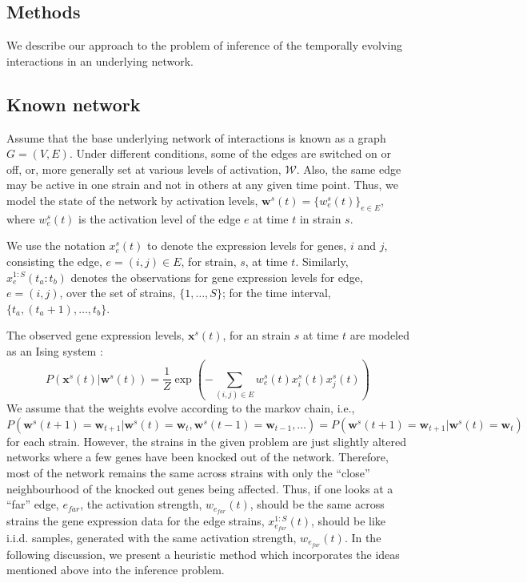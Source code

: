\documentclass{bioinfo}
\begin{document}
\begin{methods}
\section{Methods}
We describe our approach to the problem of inference of the temporally
evolving interactions in an underlying network. 
\subsection{Known network}
Assume that the base underlying network of interactions is known as a
graph $G=(V,E)$. Under different conditions, some of the edges are 
switched on or off, or, more generally set at various levels of
activation, $\mathcal W$. Also, the same edge may be active in one
strain and not in others at any given time point. Thus, we model the
state of the network by activation levels, $\mathbf{w}^{s}(t) = \{w^s_{e}(t)\}_{e
\in E}$, where $w^s_{e}(t)$ is the activation level of the edge $e$ at time $t$ in strain $s$. 

We use the notation $x^{s}_{e}(t)$ to denote the expression
levels for genes, $i$ and $j$, consisting the edge, $e=(i,j)\in E$,
for strain, $s$, at time $t$. Similarly,  $x_{e}^{1:S}(t_{a}:t_{b})$
denotes the observations for gene expression levels for edge,
$e=(i,j)$, over the set of strains, $\{1,\ldots, S\}$; for the time
interval, $\{t_{a}, (t_{a}+1), \ldots, t_{b}\}$. 

The observed gene expression levels, $\mathbf{x}^{s}(t)$, for an strain
$s$ at time $t$ are modeled as an Ising system \cite{Song09KELLER}:
\begin{equation}
\label{eq:ising}
 P\left(\mathbf{x}^{s}(t) | \mathbf{w}^{s}(t)\right) = 
      \frac{1}{Z} \exp \left( - \sum_{(i,j) \in E} w^s_{e}(t)
        x^{s}_i(t) x^{s}_j(t)\right)  
\end{equation}
We assume that the weights evolve according to the markov chain, i.e.,
$P(\mathbf{w}^{s}(t+1) = \mathbf{w}_{t+1} |  \mathbf{w}^{s}(t) =
  \mathbf{w}_{t}, \mathbf{w}^{s}(t-1) = \mathbf{w}_{t-1},
  \ldots) = P\left(\mathbf{w}^{s}(t+1) = \mathbf{w}_{t+1} |  \mathbf{w}^{s}(t) =
  \mathbf{w}_{t}\right)$ for each strain. 
However, the strains in the given problem are just slightly altered
networks where a few genes have been knocked out of the
network. Therefore, most of the network remains the same across
strains with only the ``close'' neighbourhood of the knocked out genes
being affected. Thus, if one looks at a ``far'' edge,
$e_{far}$, the activation strength, $w_{e_{far}}(t)$, should be the
same across strains  the gene expression data for the edge strains,
$x^{1:S}_{e_{far}}(t)$, should be like i.i.d. samples, generated with
the same activation strength, $w_{e_{far}}(t)$. In the following discussion, 
we present a heuristic method which incorporates the ideas mentioned
above into the inference problem. 

\end{methods}
\end{document}
